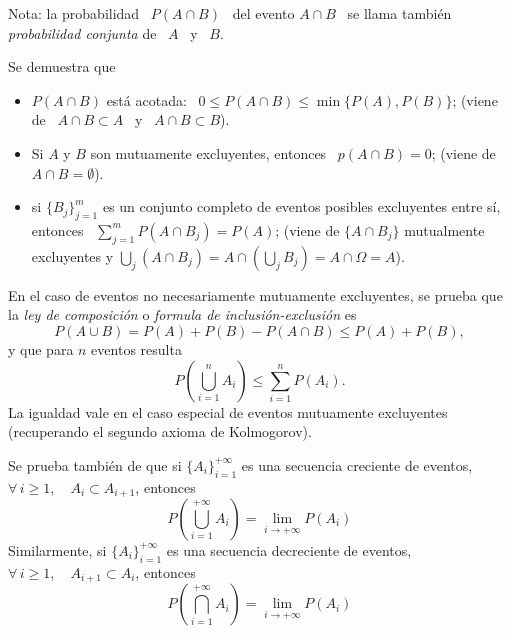 \begin{figure}[h!]
\begin{center}  \end{center}
%
\label{fig:MP:CompletoSub}
\end{figure}

Nota:  la probabilidad  \ $P(A  \cap B)$  \ del  evento $A  \cap B$  \  se llama
tambi\'en {\it probabilidad conjunta} de \ $A$ \ y \ $B$.

Se demuestra que
%
\begin{itemize}
\item $P(A  \cap B)$ est\'a acotada:  \ $0 \leq P(A  \cap B) \leq  \min\{ P(A) ,
  P(B)\}$; (viene de \ $A \cap B \subset A$ \ y \ $A \cap B \subset B$).
%
\item Si  $A$ y $B$ son  mutuamente excluyentes, entonces  \ $p(A \cap B)  = 0$;
  (viene de \ $A \cap B = \emptyset$).
%
\item  si  $\{ B_j  \}_{j=1}^m$  es un  conjunto  completo  de eventos  posibles
  excluyentes entre s\'i, entonces \ $\sum_{j=1}^m P(A \cap B_j) = P(A)$; (viene
  de  $\{ A  \cap B_j  \}$ mutualmente  excluyentes y  $\bigcup_j \left(  A \cap
    B_j\right) = A \cap \left( \bigcup_j B_j \right) = A \cap \Omega = A$).
\end{itemize}

En el caso de eventos no necesariamente mutuamente excluyentes, se prueba que la
{\it ley de composici\'on} o {\it formula de inclusi\'on-exclusi\'on} es
%
\[
P(A \cup B) = P(A) + P(B) - P(A \cap B) \leq P(A) + P(B), 
\]
%
y que para $n$ eventos resulta
%
\[
P\left( \bigcup_{i=1}^n A_i \right) \leq \sum_{i=1}^n P\left( A_i \right).
\]
%
La  igualdad  vale  en  el  caso  especial  de  eventos  mutuamente  excluyentes
(recuperando el segundo axioma de Kolmogorov).

Se  prueba tambi\'en  de que  si $\{  A_i \}_{i=1}^{+\infty}$  es  una secuencia
creciente  de eventos,  \ie $\forall  \, i  \ge 1,  \quad A_i  \subset A_{i+1}$,
entonces
%
\[
P\left( \bigcup_{i=1}^{+\infty} A_i \right) = \lim_{i \to +\infty} P(A_i)
\]
%
Similarmente,  si $\{ A_i  \}_{i=1}^{+\infty}$ es  una secuencia  decreciente de
eventos, \ie $\forall \, i \ge 1, \quad A_{i+1} \subset A_i$, entonces
%
\[
P\left( \bigcap_{i=1}^{+\infty} A_i \right) = \lim_{i \to +\infty} P(A_i)
\]

